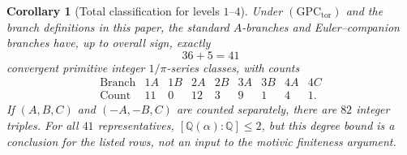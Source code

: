 \documentclass[11pt,a4paper]{amsart} %
\newtheorem{corollary}[theorem]{Corollary}
\theoremstyle{definition}
\newcommand{\Q}{\mathbb Q}
\begin{document}
\begin{corollary}[Total classification for levels \(1\)--\(4\)]
\label{cor:41}
Under \((\mathrm{GPC}_{\mathrm{tor}})\) and the branch definitions in this
paper, the standard \(A\)-branches and Euler--companion branches have, up to
overall sign, exactly
\[
36+5=41
\]
convergent primitive integer \(1/\pi\)-series classes, with counts
\[
\begin{array}{c|cccccccc}
\text{Branch}&1A&1B&2A&2B&3A&3B&4A&4C\\ \hline
\text{Count}&11&0&12&3&9&1&4&1.
\end{array}
\]
If \((A,B,C)\) and \((-A,-B,C)\) are counted separately, there are \(82\)
integer triples. For all \(41\) representatives,
\([\Q(\alpha):\Q]\le2\), but this degree bound is a conclusion for the listed
rows, not an input to the motivic finiteness argument.
\end{corollary}
\end{document}
